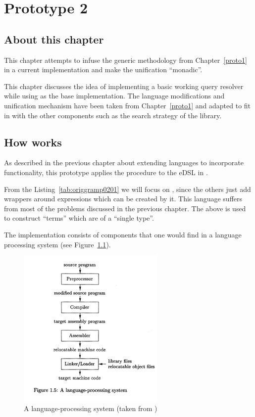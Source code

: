 \documentclass[thesis-solanki.tex]{subfiles}
\begin{document}
\chapter{Prototype 2}{\label{proto2}}

\section{About this chapter}
This chapter attempts to infuse the generic methodology from Chapter~\ref{proto1} in a current 
implementation \cite{prolog-lib} and make the unification ``monadic''.

This chapter discusses the idea of implementing a basic working  query resolver while using
\cite{prolog-lib} as the base implementation.
The language modifications and unification mechanism have been taken from Chapter~\ref{proto1} and adapted to fit
in with the other components such as the search strategy of the library.


\section{How \protect{} works}

As described in the previous chapter about extending languages to incorporate functionality, this prototype applies
the procedure to the eDSL in \cite{prolog-lib}.

From the Listing~\ref{tab:origgramp0201} we will focus on , since the others just
add wrappers around expressions which can be created by it.
This language suffers from most of the problems discussed in the previous chapter.
The above is used to construct  ``terms'' which are of a ``single type''.

The implementation consists of components that one would find in a language processing system (see
Figure~\ref{fig:A language-processing system}).



\begin{figure}[H]
\centering
\includegraphics[scale = .95]{Language_Processing_System.png}
\caption{A language-processing system (taken from \cite{Aho:1986:CPT:6448})}
\label{fig:A language-processing system}
\end{figure}
\end{document}
